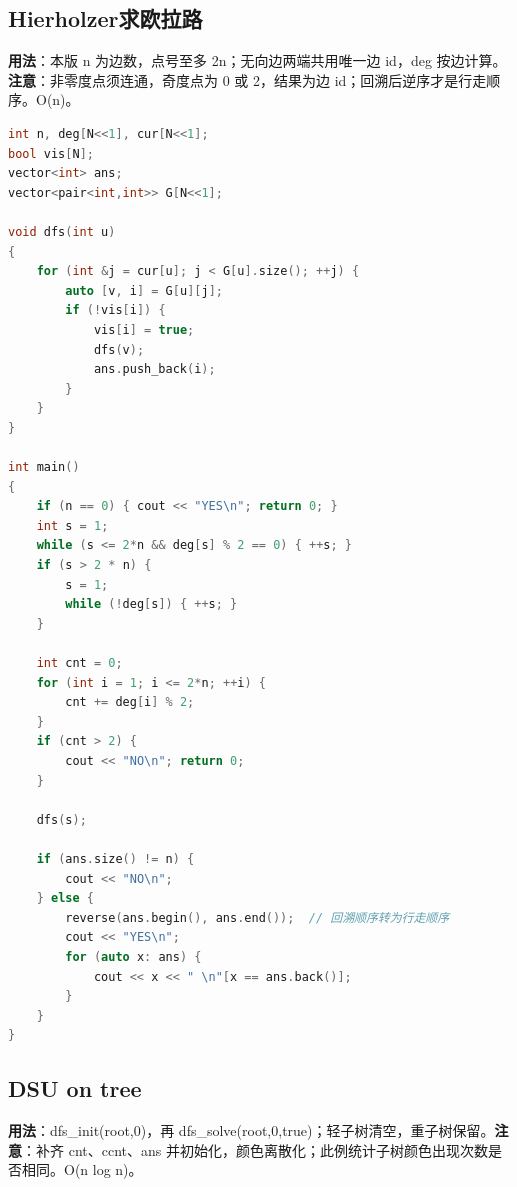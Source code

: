 \documentclass[a4paper,9pt]{extarticle}
\begin{document}
\subsection{Hierholzer求欧拉路}

\textbf{用法}：本版 n 为边数，点号至多 2n；无向边两端共用唯一边 id，deg 按边计算。\textbf{注意}：非零度点须连通，奇度点为 0 或 2，结果为边 id；回溯后逆序才是行走顺序。O(\allowbreak{}n)。

\begin{lstlisting}[language={C++}]
int n, deg[N<<1], cur[N<<1];
bool vis[N];
vector<int> ans;
vector<pair<int,int>> G[N<<1];

void dfs(int u)
{
    for (int &j = cur[u]; j < G[u].size(); ++j) {
        auto [v, i] = G[u][j];
        if (!vis[i]) {
            vis[i] = true;
            dfs(v);
            ans.push_back(i);
        }
    }
}

int main()
{
	if (n == 0) { cout << "YES\n"; return 0; }
	int s = 1;
	while (s <= 2*n && deg[s] % 2 == 0) { ++s; }
	if (s > 2 * n) {
	    s = 1;
	    while (!deg[s]) { ++s; }
	}
	
	int cnt = 0;
	for (int i = 1; i <= 2*n; ++i) {
	    cnt += deg[i] % 2;
	}
	if (cnt > 2) {
	    cout << "NO\n"; return 0;
	}
	
	dfs(s);
	
	if (ans.size() != n) {
	    cout << "NO\n";
	} else {
	    reverse(ans.begin(), ans.end());  // 回溯顺序转为行走顺序
	    cout << "YES\n";
	    for (auto x: ans) {
	        cout << x << " \n"[x == ans.back()];
	    }
	}
}
\end{lstlisting}

\subsection{DSU on tree}

\textbf{用法}：dfs\_\allowbreak{}init(\allowbreak{}root,\allowbreak{}0)，再 dfs\_\allowbreak{}solve(\allowbreak{}root,\allowbreak{}0,\allowbreak{}true)；轻子树清空，重子树保留。\textbf{注意}：补齐 cnt、ccnt、ans 并初始化，颜色离散化；此例统计子树颜色出现次数是否相同。O(\allowbreak{}n log n)。
\end{document}
